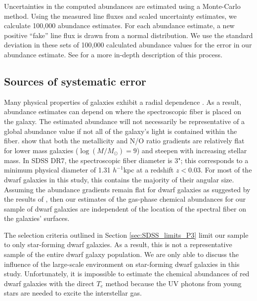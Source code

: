 Uncertainties in the computed abundances are estimated using a Monte-Carlo 
method.  Using the measured line fluxes and scaled uncertainty estimates, we 
calculate 100,000 abundance estimates.  For each abundance estimate, a new 
positive ``fake'' line flux is drawn from a normal distribution.  We use the 
standard deviation in these sets of 100,000 calculated abundance values for the 
error in our abundance estimate.  See \cite{Douglass17a} for a more in-depth 
description of this process.


\subsection{Sources of systematic error}

Many physical properties of galaxies exhibit a radial dependence \citep{Bell00}.  
As a result, abundance estimates can depend on where the spectroscopic fiber is 
placed on the galaxy.  The estimated abundance will not necessarily be 
representative of a global abundance value if not all of the galaxy's light is 
contained within the fiber.  \cite{Belfiore17} show that both the metallicity 
and N/O ratio gradients are relatively flat for lower mass galaxies 
($\log(M/M_\odot) = 9$) and steepen with increasing stellar mass.  In SDSS DR7, 
the spectroscopic fiber diameter is 3"; this corresponds to a minimum physical 
diameter of 1.31 $h^{-1}$kpc at a redshift $z < 0.03$.  For most of the dwarf 
galaxies in this study, this contains the majority of their angular size.  
Assuming the abundance gradients remain flat for dwarf galaxies as suggested by 
the results of \cite{Belfiore17}, then our estimates of the gas-phase chemical 
abundances for our sample of dwarf galaxies are independent of the location of 
the spectral fiber on the galaxies' surfaces.

The selection criteria outlined in Section \ref{sec:SDSS_limits_P3} limit our 
sample to only star-forming dwarf galaxies.  As a result, this is not a 
representative sample of the entire dwarf galaxy population.  We are only able 
to discuss the influence of the large-scale environment on star-forming dwarf 
galaxies in this study.  Unfortunately, it is impossible to estimate the 
chemical abundances of red dwarf galaxies with the direct $T_e$ method because 
the UV photons from young stars are needed to excite the interstellar gas.


